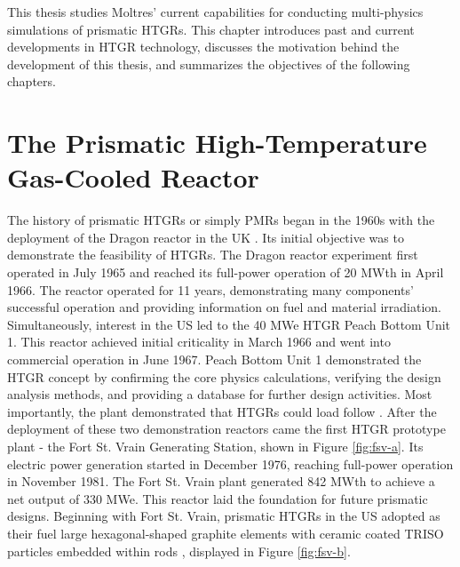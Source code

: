 This thesis studies Moltres' current capabilities for conducting multi-physics simulations of prismatic \glspl{HTGR}.
This chapter introduces past and current developments in \gls{HTGR} technology, discusses the motivation behind the development of this thesis, and summarizes the objectives of the following chapters.

\section{The Prismatic High-Temperature Gas-Cooled Reactor}
\label{sec:pmr}

The history of prismatic \glspl{HTGR} or simply \glspl{PMR} began in the 1960s with the deployment of the Dragon reactor in the \gls{UK} \cite{brey_development_2001}.
Its initial objective was to demonstrate the feasibility of \glspl{HTGR}.
The Dragon reactor experiment first operated in July 1965 and reached its full-power operation of 20 MWth in April 1966.
The reactor operated for 11 years, demonstrating many components' successful operation and providing information on fuel and material irradiation.
Simultaneously, interest in the \gls{US} led to the 40 MWe \gls{HTGR} Peach Bottom Unit 1.
This reactor achieved initial criticality in March 1966 and went into commercial operation in June 1967.
Peach Bottom Unit 1 demonstrated the \gls{HTGR} concept by confirming the core physics calculations, verifying the design analysis methods, and providing a database for further design activities.
Most importantly, the plant demonstrated that \glspl{HTGR} could load follow \cite{brey_development_2001}.
After the deployment of these two demonstration reactors came the first \gls{HTGR} prototype plant - the Fort St. Vrain Generating Station, shown in Figure \ref{fig:fsv-a}.
Its electric power generation started in December 1976, reaching full-power operation in November 1981.
The Fort St. Vrain plant generated 842 MWth to achieve a net output of 330 MWe.
This reactor laid the foundation for future prismatic designs.
Beginning with Fort St. Vrain, prismatic HTGRs in the \gls{US} adopted as their fuel large hexagonal-shaped graphite elements with ceramic coated \gls{TRISO} particles embedded within rods \cite{brey_development_2001}, displayed in Figure \ref{fig:fsv-b}.

